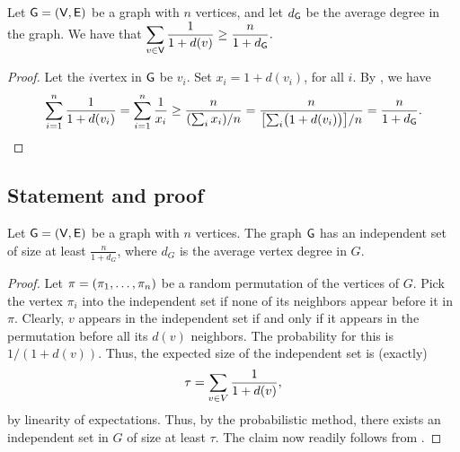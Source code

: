 \begin{lemma}
    Let $\mathsf{G}=(\mathsf{V},\mathsf{E})$ be a graph with $n$ vertices, and let
    $d_{\mathsf{G}}$ be the average degree in the graph. We have
    that
    \begin{math}
        \displaystyle \sum_{v \in \mathsf{V}} \frac{1}{1+d(v)} \geq \frac{n}{1+d_{\mathsf{G}}}.
    \end{math}
\end{lemma}
\begin{proof}
    Let the $i$\th vertex in $\mathsf{G}$ be $v_i$. Set $x_i = 1+ d(v_i)$, for
    all $i$.  By , we have
    \begin{equation*}
        \sum_{i=1}^n \frac{1}{1+d(v_i)}
        =%
        \sum_{i=1}^n \frac{1}{x_i}%
        \geq%
        \frac{n}{(\sum_i x_i)/n}
        =%
        \frac{n}{\bigl[\sum_i \bigl(1+d(v_i)\bigr) \bigr] /n}
        =%
        \frac{n}{1+d_\G}.
    \end{equation*}
\end{proof}

\subsection{Statement and proof}

\begin{theorem}
    Let $\mathsf{G}=(\mathsf{V},\mathsf{E})$ be a graph with $n$ vertices. The
    graph $\mathsf{G}$ has an independent set of size at least
    $\displaystyle \frac{n}{1+d_G}$, where $d_G$
    is the average vertex degree in $G$.
\end{theorem}

\begin{proof}
    Let $\pi = \pth{\pi_1, \ldots, \pi_n}$ be a random permutation of
    the vertices of $G$. Pick the vertex $\pi_i$ into the independent
    set if none of its neighbors appear before it in $\pi$. Clearly,
    $v$ appears in the independent set if and only if it appears in
    the permutation before all its $d(v)$ neighbors. The probability
    for this is $1/(1+d(v))$. Thus, the
    expected size of the independent set is (exactly)
    \begin{equation}
        \tau = \sum_{v \in V} \frac{1}{1+d(v)}, 
        \eqlab{one}
    \end{equation}
    by linearity of expectations. Thus, by the probabilistic method,
    there exists an independent set in $G$ of size at least $\tau$.
    The claim now readily follows from
    .
\end{proof}

